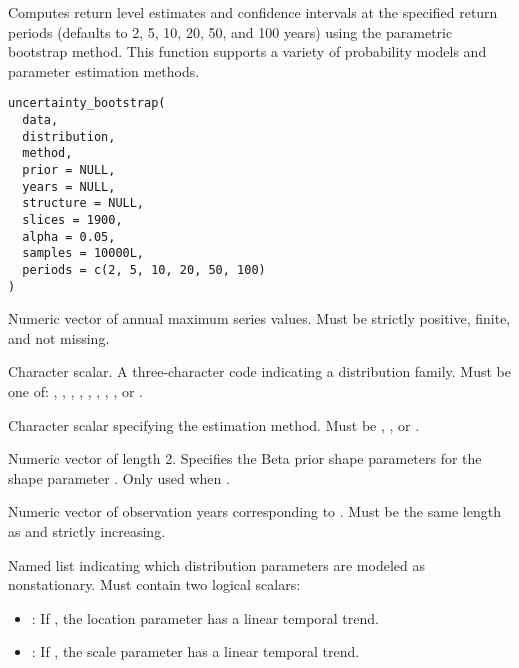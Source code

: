 \documentclass[a4paper]{book}
\begin{document}
%
\begin{Description}
Computes return level estimates and confidence intervals at the specified return
periods (defaults to 2, 5, 10, 20, 50, and 100 years) using the parametric bootstrap
method. This function supports a variety of probability models and parameter estimation
methods.
\end{Description}
%
\begin{Usage}
\begin{verbatim}
uncertainty_bootstrap(
  data,
  distribution,
  method,
  prior = NULL,
  years = NULL,
  structure = NULL,
  slices = 1900,
  alpha = 0.05,
  samples = 10000L,
  periods = c(2, 5, 10, 20, 50, 100)
)
\end{verbatim}
\end{Usage}
%
\begin{Arguments}
\begin{ldescription}
\item[\code{data}] Numeric vector of annual maximum series values.
Must be strictly positive, finite, and not missing.

\item[\code{distribution}] Character scalar. A three-character code indicating
a distribution family. Must be one of: , , ,
, , , , , or .

\item[\code{method}] Character scalar specifying the estimation method.
Must be , , or .

\item[\code{prior}] Numeric vector of length 2. Specifies the Beta prior shape
parameters  for the shape parameter \eqn{\kappa}{}.
Only used when .

\item[\code{years}] Numeric vector of observation years corresponding to .
Must be the same length as  and strictly increasing.

\item[\code{structure}] Named list indicating which distribution parameters are
modeled as nonstationary. Must contain two logical scalars:
\begin{itemize}

\item{} : If , the location parameter has a linear temporal trend.
\item{} : If , the scale parameter has a linear temporal trend.


\end{itemize}
\end{ldescription}
\end{Arguments}
\end{document}
